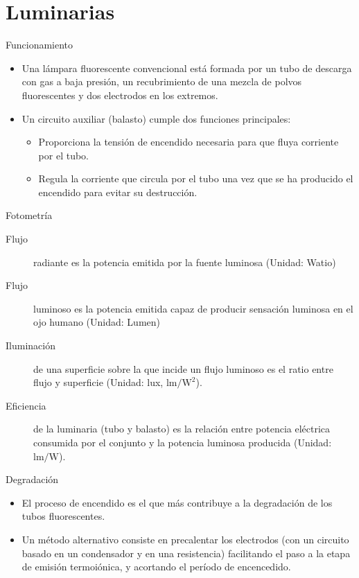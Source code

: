 \documentclass[xcolor={usenames,svgnames,dvipsnames}]{beamer}
\begin{document}
\section{Luminarias}
\label{sec-4}

\begin{frame}[label=sec-4-0-1]{Funcionamiento}
\begin{itemize}
\item Una lámpara fluorescente convencional está formada por un \alert{tubo de descarga con gas a baja presión}, un \alert{recubrimiento de una mezcla de polvos fluorescentes} y \alert{dos electrodos} en los extremos.

\item Un \alert{circuito auxiliar (balasto)} cumple dos funciones principales:

\begin{itemize}
\item \alert{Proporciona la tensión de encendido} necesaria para que fluya corriente por el tubo.

\item \alert{Regula la corriente} que circula por el tubo una vez que se ha producido el encendido para evitar su destrucción.
\end{itemize}
\end{itemize}
\end{frame}

\begin{frame}[label=sec-4-0-2]{Fotometría}
\begin{description}
\item[{Flujo}] radiante es la potencia emitida por la fuente luminosa (Unidad: Watio)

\item[{Flujo}] luminoso es la potencia emitida capaz de producir sensación luminosa en el ojo humano (Unidad: Lumen)

\item[{Iluminación}] de una superficie sobre la que incide un flujo luminoso es el ratio entre flujo y superficie (Unidad: lux, $\si{\lumen\per\watt\squared}$).

\item[{Eficiencia}] de la luminaria (tubo y balasto) es la relación entre potencia eléctrica consumida por el conjunto y la potencia luminosa producida (Unidad: $\si{\lumen\per\watt}$).
\end{description}
\end{frame}
\begin{frame}[label=sec-4-0-3]{Degradación}
\begin{itemize}
\item \alert{El proceso de encendido es el que más contribuye a la degradación} de los tubos fluorescentes.
\item Un método alternativo consiste en \alert{precalentar los electrodos} (con un circuito basado en un condensador y en una resistencia) facilitando el paso a la etapa de emisión termoiónica, y acortando el período de encencedido.
\end{itemize}
\end{frame}
\end{document}

